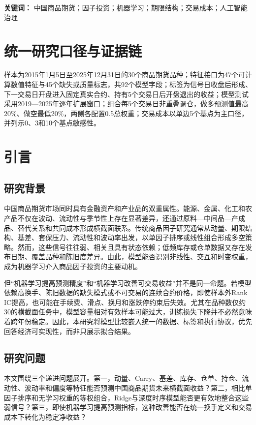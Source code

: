 \documentclass[UTF8,zihao=-4,fontset=ubuntu]{ctexart}
\begin{document}
\noindent\textbf{关键词：} 中国商品期货；因子投资；机器学习；期限结构；交易成本；人工智能治理

\section*{统一研究口径与证据链}
样本为2015年1月5日至2025年12月31日的30个商品期货品种；特征接口为47个可计算数值特征与45个缺失或质量标志，共92个模型字段；标签为信号日收盘后形成、下一交易日开盘进入固定真实合约、持有5个交易日后开盘退出的收益；模型测试采用2019—2025年逐年扩展窗口；组合每5个交易日非重叠调仓，做多预测值最高20\%、做空最低20\%，两侧各配置0.5总权重；交易成本以单边5个基点为主口径，并列示0、3和10个基点敏感性。

\section{引言}

\subsection{研究背景}

中国商品期货市场同时具有金融资产和产业品的双重属性。能源、金属、化工和农产品不仅在波动、流动性与季节性上存在显著差异，还通过原料—中间品—产成品、替代关系和共同成本形成横截面联系。传统商品因子研究通常从动量、期限结构、基差、套保压力、流动性和波动率出发，以单因子排序或线性组合形成多空策略。然而，这些信号往往弱、相关且具有状态依赖；低频库存或仓单数据又存在发布日期、覆盖品种和陈旧度差异。由此，模型能否识别非线性、交互和时变权重，成为机器学习介入商品因子投资的主要动机。

但“机器学习提高预测精度”和“机器学习改善可交易收益”并不是同一命题。若模型依赖高换手、陈旧数据的缺失模式或不可交易的连续合约价格，即使样本外Rank IC提高，也可能在手续费、滑点、换月和涨跌停约束后失效。尤其在品种数仅约30的横截面任务中，模型容量相对有效样本可能过大，训练损失下降并不必然意味着跨年份稳定。因此，本研究将模型比较嵌入统一的数据、标签和执行协议，优先回答经济可实现性，而非只展示拟合结果。

\subsection{研究问题}

本文围绕三个递进问题展开。第一，动量、Carry、基差、库存、仓单、持仓、流动性、波动率和偏度等特征能否预测中国商品期货未来横截面收益？第二，相比单因子排序和无学习权重的等权组合，Ridge与深度时序模型能否更有效地整合这些弱信号？第三，即使机器学习提高预测指标，这种改善能否在统一换手定义和交易成本下转化为稳定净收益？
\end{document}
